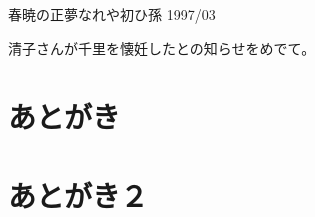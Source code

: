 \documentclass[b5paper]{tbook}
\begin{document}
\begin{shiika}春暁の正夢なれや初ひ孫 1997/03\end{shiika}

清子さんが千里を懐妊したとの知らせをめでて。


%


\chapter*{あとがき}


\chapter*{あとがき２}


\end{document}
